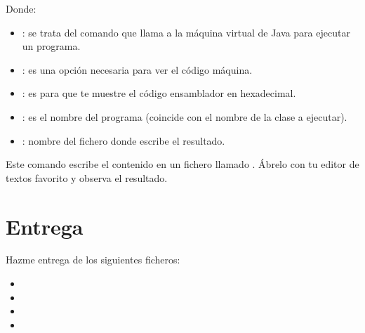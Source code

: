 \documentclass[letterpaper,10pt,spanish]{sphinxmanual}
\begin{document}
\sphinxAtStartPar
Donde:
\begin{itemize}
\item {} 
\sphinxAtStartPar
{}: se trata del comando que llama a la máquina virtual de Java para ejecutar un programa.

\item {} 
\sphinxAtStartPar
{}: es una opción necesaria para ver el código máquina.

\item {} 
\sphinxAtStartPar
{}: es para que te muestre el código ensamblador en hexadecimal.

\item {} 
\sphinxAtStartPar
{}: es el nombre del programa (coincide con el nombre de la clase a ejecutar).

\item {} 
\sphinxAtStartPar
{}: nombre del fichero donde escribe el resultado.

\end{itemize}

\sphinxAtStartPar
Este comando escribe el contenido en un fichero llamado . Ábrelo con tu editor de textos favorito y observa el resultado.


\section{Entrega}
\label{\detokenize{lab2:entrega}}
\sphinxAtStartPar
Hazme entrega de los siguientes ficheros:
\begin{itemize}
\item {} 
\sphinxAtStartPar
{}

\item {} 
\sphinxAtStartPar
{}

\item {} 
\sphinxAtStartPar
{}

\item {} 
\sphinxAtStartPar
{}

\end{itemize}
\end{document}
